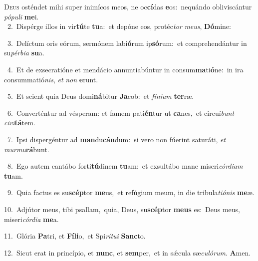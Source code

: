 \lettrine{\initial\textcolor{\initialcolor}{D}}{eus} osténdet mihi super inimícos meos, ne oc\-\textbf{cí}\-das \textbf{e}\-os:~\star nequándo obliviscántur \textit{pó}\-\textit{pu}\textit{li} \textbf{me}\-i.\\
{\numbfont\textcolor{\numbcolor}{~2.}}~Dispérge illos in vir\-\textbf{tú}\-te \textbf{tu}\-a:~\star et depóne eos, protéc\textit{tor} \textit{me}\-\textit{us}, \textbf{Dó}\-mine:\par
{\numbfont\textcolor{\numbcolor}{~3.}}~Delíctum oris eórum, sermónem labi\-\textbf{ó}\-rum ip\-\textbf{só}\-rum:~\star et comprehendántur in su\-\textit{pér}\-\textit{bi}\textit{a} \textbf{su}\-a.\par
{\numbfont\textcolor{\numbcolor}{~4.}}~Et de exsecratióne et mendácio annuntiabúntur in consum\-\textbf{ma}\-ti\-\textbf{ó}\-ne:~\star in ira consummatió\-\textit{nis}\-, \textit{et} \textit{non} \textbf{e}\-runt.\par
{\numbfont\textcolor{\numbcolor}{~5.}}~Et scient quia Deus domi\-\textbf{ná}\-bitur \textbf{Ja}\-cob:~\star et \textit{fí}\-\textit{ni}\textit{um} \textbf{ter}\-ræ.\par
{\numbfont\textcolor{\numbcolor}{~6.}}~Converténtur ad vésperam: et famem pati\-\textbf{én}\-tur ut \textbf{ca}\-nes,~\star et circuí\textit{bunt} \textit{ci}\-\textit{vi}\textbf{tá}tem.\par
{\numbfont\textcolor{\numbcolor}{~7.}}~Ipsi dispergéntur ad \textbf{man}\-du\-\textbf{cán}\-dum:~\star si vero non fúerint saturáti, \textit{et} \textit{mur}\-\textit{mu}\textbf{rá}bunt.\par
{\numbfont\textcolor{\numbcolor}{~8.}}~Ego autem cantábo forti\-\textbf{tú}\-dinem \textbf{tu}\-am:~\star et exsultábo mane miseri\-\textit{cór}\-\textit{di}\textit{am} \textbf{tu}\-am.\par
{\numbfont\textcolor{\numbcolor}{~9.}}~Quia factus es su\-\textbf{scép}\-tor \textbf{me}\-us,~\star et refúgium meum, in die tribula\-\textit{ti}\-\textit{ó}\textit{nis} \textbf{me}\-æ.\par
{\numbfont\textcolor{\numbcolor}{10.}}~Adjútor meus, tibi psallam,~\dagger quia, Deus, su\-\textbf{scép}\-tor \textbf{me}\-\textbf{us} es:~\star Deus meus, miseri\-\textit{cór}\-\textit{di}\textit{a} \textbf{me}\-a.\par
{\numbfont\textcolor{\numbcolor}{11.}}~Glória \textbf{Pa}\-tri, et \textbf{Fí}\-\textbf{li}o,~\star et Spi\-\textit{rí}\-\textit{tu}\textit{i} \textbf{Sanc}\-to.\par
{\numbfont\textcolor{\numbcolor}{12.}}~Sicut erat in princípio, et \textbf{nunc}\-, et \textbf{sem}\-per,~\star et in sǽcula sæ\-\textit{cu}\-\textit{ló}\textit{rum}. \textbf{A}\-men.\par
